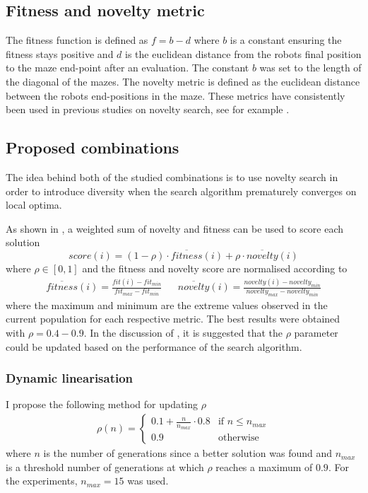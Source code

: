 \subsection{Fitness and novelty metric}
\label{subsection:metrics}
The fitness function is defined as $f = b - d$ where $b$ is a constant ensuring the fitness stays positive
and $d$ is the euclidean distance from the robots final position to the maze end-point after an evaluation.
The constant $b$ was set to the length of the diagonal of the mazes.
The novelty metric is defined as the euclidean distance between the robots end-positions in the maze.
These metrics have consistently been used in previous studies on novelty search, see for example \cite{ns_study,novelty_alone}.

\subsection{Proposed combinations}
\label{subsection:linearisation}
The idea behind both of the studied combinations is to use novelty search in order to introduce diversity
when the search algorithm prematurely converges on local optima.

As shown in \cite{novelty_not_enough}, a weighted sum of novelty and fitness can be used to score each solution
\[
    score(i) = (1-\rho) \cdot \overline{fitness}(i) + \rho \cdot \overline{novelty}(i)
\]
where $\rho \in [0,1]$ and the fitness and novelty score are normalised according to
\begin{align*}
    \overline{fitness}(i) =  \frac{fit(i) - fit_{min}}{fit_{max} - fit_{min}} && \overline{novelty}(i) =  \frac{novelty(i) - novelty_{min}}{novelty_{max} - novelty_{min}}
\end{align*}
where the maximum and minimum are the extreme values observed in the current population for each respective metric.
The best results were obtained with $\rho=0.4-0.9$. In the discussion of \cite{novelty_not_enough}, it is suggested
that the $\rho$ parameter could be updated based on the performance of the search algorithm.

\subsubsection{Dynamic linearisation}
\label{subsubsection:dynamic_linearisation}
I propose the following method for updating $\rho$
\begin{align*}
    \rho(n) =
        \begin{cases}
            0.1 + \frac{n}{n_{max}} \cdot 0.8 & \text{if $n \leq n_{max}$}\\
            0.9 & \text{otherwise}
        \end{cases}
\end{align*}
where $n$ is the number of generations since a better solution was found and
$n_{max}$ is a threshold number of generations at which $\rho$ reaches a maximum
of $0.9$. For the experiments, $n_{max}=15$ was used.

